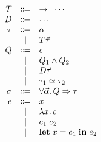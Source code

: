 \documentclass[12pt]{article}
\begin{document}
\pagestyle{empty}

\begin{align*}
    \begin{array}{rcl}
        T
        &\Coloneqq &{\to} \mid \cdots \\
        D
        &\Coloneqq &\cdots \\
        \tau
        &\Coloneqq &\alpha \\
        &\mid &T \vec{\tau} \\
        Q
        &\Coloneqq &\epsilon \\
        &\mid &Q_1 \land Q_2 \\
        &\mid &D \vec{\tau} \\
        &\mid &\tau_1 \simeq \tau_2 \\
        \sigma
        &\Coloneqq &\forall \vec{\alpha}\ldotp Q \Rightarrow \tau \\
        e
        &\Coloneqq &x \\
        &\mid &\lambda x\ldotp e \\
        &\mid &e_1\; e_2 \\
        &\mid &\mathbf{let}\; x = e_1\; \mathbf{in}\; e_2
    \end{array}
\end{align*}
\end{document}
